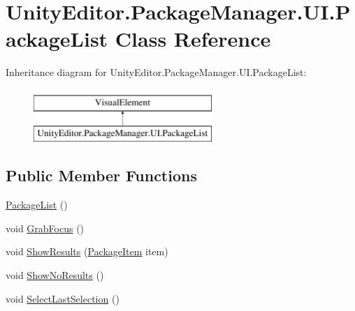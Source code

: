 \hypertarget{class_unity_editor_1_1_package_manager_1_1_u_i_1_1_package_list}{}\section{Unity\+Editor.\+Package\+Manager.\+U\+I.\+Package\+List Class Reference}
\label{class_unity_editor_1_1_package_manager_1_1_u_i_1_1_package_list}
Inheritance diagram for Unity\+Editor.\+Package\+Manager.\+U\+I.\+Package\+List\+:\begin{figure}[H]
\begin{center}
\leavevmode
\includegraphics[height=2.000000cm]{class_unity_editor_1_1_package_manager_1_1_u_i_1_1_package_list}
\end{center}
\end{figure}
\subsection*{Public Member Functions}
\begin{DoxyCompactItemize}
\item 
\mbox{\hyperlink{class_unity_editor_1_1_package_manager_1_1_u_i_1_1_package_list_ac0ea717075ee9f54e3a5ba2178d986f1}{Package\+List}} ()
\item 
void \mbox{\hyperlink{class_unity_editor_1_1_package_manager_1_1_u_i_1_1_package_list_afd9ece07ac1c6ca28df55a4a36c7e18e}{Grab\+Focus}} ()
\item 
void \mbox{\hyperlink{class_unity_editor_1_1_package_manager_1_1_u_i_1_1_package_list_aad7539a4939625a8d07789fa6e6a79e4}{Show\+Results}} (\mbox{\hyperlink{class_unity_editor_1_1_package_manager_1_1_u_i_1_1_package_item}{Package\+Item}} item)
\item 
void \mbox{\hyperlink{class_unity_editor_1_1_package_manager_1_1_u_i_1_1_package_list_a4417788ed97117f5178b392677479e70}{Show\+No\+Results}} ()
\item 
void \mbox{\hyperlink{class_unity_editor_1_1_package_manager_1_1_u_i_1_1_package_list_af612e5466f7e665aba4a77ffbbb10925}{Select\+Last\+Selection}} ()
\end{DoxyCompactItemize}

